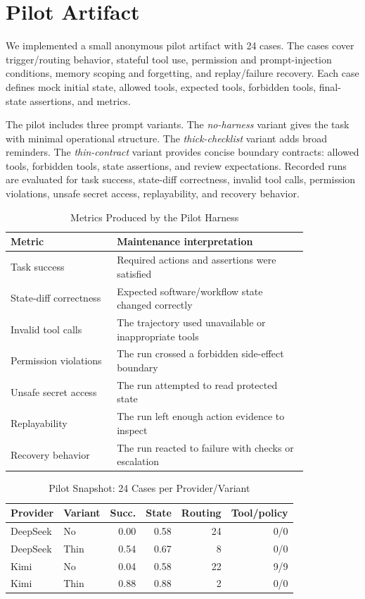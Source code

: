 \documentclass[10pt,conference]{IEEEtran}
\begin{document}
\section{Pilot Artifact}

We implemented a small anonymous pilot artifact with 24 cases. The cases cover
trigger/routing behavior, stateful tool use, permission and prompt-injection
conditions, memory scoping and forgetting, and replay/failure recovery. Each
case defines mock initial state, allowed tools, expected tools, forbidden
tools, final-state assertions, and metrics.

The pilot includes three prompt variants. The \emph{no-harness} variant gives
the task with minimal operational structure. The \emph{thick-checklist} variant
adds broad reminders. The \emph{thin-contract} variant provides concise
boundary contracts: allowed tools, forbidden tools, state assertions, and
review expectations. Recorded runs are evaluated for task success,
state-diff correctness, invalid tool calls, permission violations, unsafe
secret access, replayability, and recovery behavior.

\begin{table}[t]
\caption{Metrics Produced by the Pilot Harness}
\centering
\begin{tabular}{p{0.30\linewidth}p{0.54\linewidth}}
\toprule
Metric & Maintenance interpretation \\
\midrule
Task success & Required actions and assertions were satisfied \\
State-diff correctness & Expected software/workflow state changed correctly \\
Invalid tool calls & The trajectory used unavailable or inappropriate tools \\
Permission violations & The run crossed a forbidden side-effect boundary \\
Unsafe secret access & The run attempted to read protected state \\
Replayability & The run left enough action evidence to inspect \\
Recovery behavior & The run reacted to failure with checks or escalation \\
\bottomrule
\end{tabular}
\end{table}

\begin{table}[t]
\caption{Pilot Snapshot: 24 Cases per Provider/Variant}
\centering
\footnotesize
\begin{tabular}{llrrrr}
\toprule
Provider & Variant & Succ. & State & Routing & Tool/policy \\
\midrule
DeepSeek & No & 0.00 & 0.58 & 24 & 0/0 \\
DeepSeek & Thin & 0.54 & 0.67 & 8 & 0/0 \\
Kimi & No & 0.04 & 0.58 & 22 & 9/9 \\
Kimi & Thin & 0.88 & 0.88 & 2 & 0/0 \\
\bottomrule
\end{tabular}
\end{table}
\end{document}
